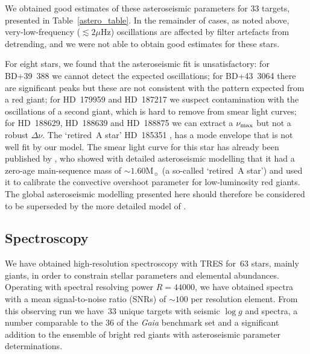 \documentclass[modern]{aastex62}
\newcommand{\numax}{\mbox{$\nu_{\rm max}$}\xspace}
\newcommand{\Dnu}{\mbox{$\Delta \nu$}\xspace}
\newcommand{\muHz}{\mbox{$\mu$Hz}\xspace}
\newcommand{\logg}{\mbox{$\log g$}\xspace}
\newcommand{\msun}{\mbox{$\mathrm{M}_{\sun}$}\xspace}
\newcommand{\gaia}{\textit{Gaia}\xspace}
\begin{document}
We obtained good estimates of these asteroseismic parameters for 33 targets, presented in Table~\ref{astero_table}. In the remainder of cases, as noted above, very-low-frequency ($\lesssim 2\muHz$) oscillations are affected by filter artefacts from detrending, and we were not able to obtain good estimates for these stars. 

For eight stars, we found that the asteroseismic fit is unsatisfactory: for BD+39~388 we cannot detect the expected oscillations; for BD+43~3064 there are significant peaks but these are not consistent with the pattern expected from a red giant; for HD~179959 and HD~187217 we suspect contamination with the oscillations of a second giant, which is hard to remove from smear light curves; for HD~188629, HD~188639 and HD~188875 we can extract a \numax but not a robust \Dnu. The `retired~A star' HD~185351 \citep[studied by][]{2014ApJ...794...15J}, has a mode envelope that is not well fit by our model. The smear light curve for this star has already been published by \citet{2017MNRAS.464.3713H}, who showed with detailed asteroseismic modelling that it had a zero-age main-sequence mass of $\sim 1.60 \msun$ (a so-called `retired~A star') and used it to calibrate the convective overshoot parameter for low-luminosity red giants. The global asteroseismic modelling presented here should therefore be considered to be superseded by the more detailed model of \citet{2017MNRAS.464.3713H}. 



\subsection{Spectroscopy}
\label{spectroscopy}

We have obtained high-resolution spectroscopy with TRES for~63 stars, mainly giants, in order to constrain stellar parameters and elemental abundances. Operating with spectral resolving power $R=44 000$, we have obtained spectra with a mean signal-to-noise ratio (SNRs) of $\sim 100$  per resolution element. %
From this observing run we have~33 unique targets with seismic \logg and spectra, a number comparable to the 36 of the \gaia benchmark set \citep{2018RNAAS...2c.152J} and a significant addition to the ensemble of bright red giants with asteroseismic parameter determinations. %
\end{document}
